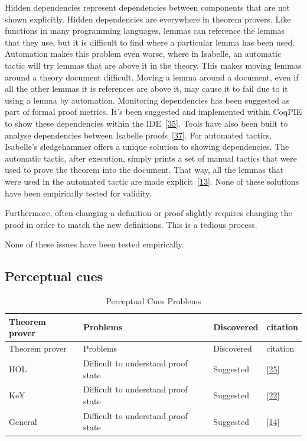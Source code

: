\documentclass[
]{article}
\begin{document}
Hidden dependencies represent dependencies between components that are
not shown explicitly. Hidden dependencies are everywhere in theorem
provers. Like functions in many programming languages, lemmas can
reference the lemmas that they use, but it is difficult to find where a
particular lemma has been used. Automation makes this problem even
worse, where in Isabelle, an automatic tactic will try lemmas that are
above it in the theory. This makes moving lemmas around a theory
document difficult. Moving a lemma around a document, even if all the
other lemmas it is references are above it, may cause it to fail due to
it using a lemma by automation. Monitoring dependencies has been
suggested as part of formal proof metrics. It's been suggested and
implemented within CoqPIE to show these dependencies within the
IDE~{[}\protect\hyperlink{ref-roe_coqpie_2016}{35}{]}. Tools have also
been built to analyse dependencies between Isabelle
proofs~{[}\protect\hyperlink{ref-spichkova_human-centred_2017}{37}{]}.
For automated tactics, Isabelle's sledgehammer offers a unique solution
to showing dependencies. The automatic tactic, after execution, simply
prints a set of manual tactics that were used to prove the theorem into
the document. That way, all the lemmas that were used in the automated
tactic are made
explicit~{[}\protect\hyperlink{ref-bourke_challenges_2012}{13}{]}. None
of these solutions have been empirically tested for validity.

Furthermore, often changing a definition or proof slightly requires
changing the proof in order to match the new definitions. This is a
tedious process.

None of these issues have been tested empirically.

\hypertarget{perceptual-cues-1}{%
\subsection{Perceptual cues}\label{perceptual-cues-1}}

\hypertarget{tbl:perceptual_cues}{}
\begin{longtable}[]{@{}llll@{}}
\caption{\label{tbl:perceptual_cues}Perceptual Cues
Problems}\tabularnewline
\toprule
Theorem prover & Problems & Discovered & citation \\
\midrule
\endfirsthead
\toprule
Theorem prover & Problems & Discovered & citation \\
\midrule
\endhead
HOL & Difficult to understand proof state & Suggested &
{[}\protect\hyperlink{ref-kadoda_cognitive_2000}{25}{]} \\
KeY & Difficult to understand proof state & Suggested &
{[}\protect\hyperlink{ref-hentschel_integrating_2016}{22}{]} \\
General & Difficult to understand proof state & Suggested &
{[}\protect\hyperlink{ref-eastaughffe_support_1998}{14}{]} \\
\bottomrule
\end{longtable}
\end{document}
